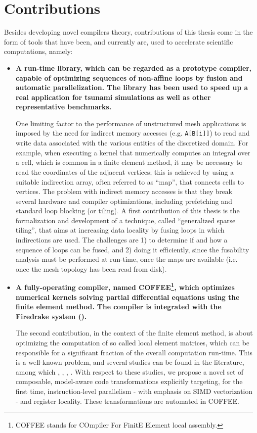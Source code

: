 \section{Contributions}
Besides developing novel compilers theory, contributions of this thesis come in the form of
tools that have been, and currently are, used to accelerate scientific computations, namely:
\begin{itemize}
\item \textbf{A run-time library, which can be regarded as a prototype compiler,
capable of optimizing sequences of non-affine loops by fusion and automatic
parallelization. The library has been used to speed up a real application
for tsunami simulations as well as other representative benchmarks.}

One limiting factor to the performance of unstructured mesh applications is imposed by
the need for indirect memory accesses (e.g. \texttt{A[B[i]]}) to read and
write data associated with the various entities of the discretized domain.
For example, when executing a kernel that numerically computes an integral over a cell, 
which is common in a finite element method, it may be necessary
to read the coordinates of the adjacent vertices; this is achieved by
using a suitable indirection array, often referred to as ``map'', that
connects cells to vertices. The problem with indirect 
memory accesses is that they break several hardware and compiler optimizations,
including prefetching and standard loop blocking (or tiling). A first contribution of this thesis
is the formalization and development of a technique, called ``generalized sparse tiling'',
that aims at increasing data locality by fusing loops in which indirections
are used. The challenges are 1) to determine if and how a sequence of loops can be fused,
and 2) doing it efficiently, since the fusability analysis must be performed at
run-time, once the maps are available (i.e. once the mesh topology has been read 
from disk).

\item \textbf{A fully-operating compiler, named COFFEE\footnote{COFFEE stands
for COmpiler For FinitE Element local assembly.}, which optimizes numerical
kernels solving partial differential equations using the finite element method.
The compiler is integrated with the Firedrake system (\cite{firedrake-code}).}

The second contribution, in the context of the finite element method, is about 
optimizing the computation of so called local element matrices, which can 
be responsible for a significant fraction of the overall computation run-time.
This is a well-known problem, and several studies can be found in the literature,
among which \cite{francis}, \cite{quadrature-olegaard}, \cite{petsc-integration-gpu}, 
\cite{tensor-kirby}. With respect to these studies, we propose a novel 
set of composable, model-aware code transformations explicitly targeting, for the first time,
instruction-level parallelism - with emphasis on SIMD vectorization - and register locality. 
These transformations are automated in COFFEE.

\end{itemize}





